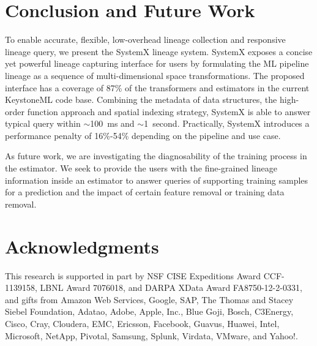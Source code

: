 \documentclass{sig-alternate}
\begin{document}
\section{Conclusion and Future Work}
\label{sec:Conclusion}
To enable accurate, flexible, low-overhead lineage collection and responsive lineage query, we present the SystemX lineage system.
SystemX exposes a concise yet powerful lineage capturing interface for users by formulating the ML pipeline lineage as a sequence
of multi-dimensional space transformations. The proposed interface has a coverage of 87\% of the transformers and estimators
in the current KeystoneML code base. Combining the metadata of data structures, the high-order function approach and spatial indexing
strategy, SystemX is able to answer typical query within $\sim$100~ms and $\sim$1~second. Practically, SystemX introduces a
performance penalty of 16\%-54\% depending on the pipeline and use case.

As future work, we are investigating the diagnosability of the training process in the estimator. We seek to provide the users with
the fine-grained lineage information inside an estimator to answer queries of supporting training samples for
a prediction and the impact of certain feature removal or training data removal.

\section{Acknowledgments}
This research is supported in part by NSF CISE Expeditions Award CCF-1139158, LBNL Award 7076018, and DARPA XData Award FA8750-12-2-0331, and gifts from Amazon Web Services, Google, SAP,  The Thomas and Stacey Siebel Foundation, Adatao, Adobe, Apple, Inc., Blue Goji, Bosch, C3Energy, Cisco, Cray, Cloudera, EMC, Ericsson, Facebook, Guavus, Huawei, Intel, Microsoft, NetApp, Pivotal, Samsung, Splunk, Virdata, VMware, and Yahoo!. 

%

%
%



\balancecolumns

\end{document}
